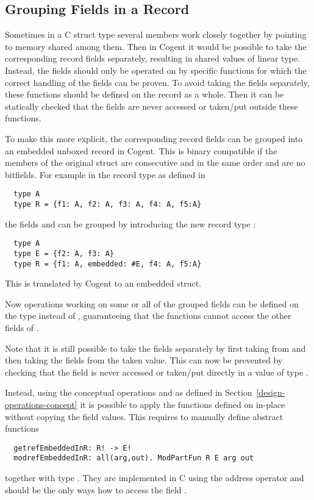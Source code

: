\subsection{Grouping Fields in a Record}
\label{app-transtype-group}

Sometimes in a C struct type several members work closely together by pointing to memory
shared among them. Then in Cogent it would be possible to take the corresponding record fields separately,
resulting in shared values of linear type. Instead, the fields should only be operated on by specific functions
for which the correct handling of the fields can be proven. To avoid taking the fields separately, these
functions should be defined on the record as a whole. Then it can be statically checked that the fields
are never accessed or taken/put outside these functions.

To make this more explicit, the corresponding record fields can be grouped into an embedded unboxed
record in Cogent. This is binary compatible if the members of the original struct are consecutive and in
the same order and are no bitfields. For example in the record type  as defined in 
\begin{verbatim}
  type A
  type R = {f1: A, f2: A, f3: A, f4: A, f5:A}
\end{verbatim}
the fields  and  can be grouped by introducing the new record type :
\begin{verbatim}
  type A
  type E = {f2: A, f3: A}
  type R = {f1: A, embedded: #E, f4: A, f5:A}
\end{verbatim}
This is translated by Cogent to an embedded struct.

Now operations working on some or all of the grouped fields can be defined on the type  instead
of , guaranteeing that the functions cannot access the other fields of .

Note that it is still possible to take the fields separately by first taking  from 
and then taking the fields from the taken value. This can now be prevented by checking that the field
 is never accessed or taken/put directly in a value of type .

Instead, using the conceptual operations  and  as defined in 
Section~\ref{design-operations-concept}
it is possible to apply the functions defined on  in-place without copying the field values.
This requires to manually define abstract functions
\begin{verbatim}
  getrefEmbeddedInR: R! -> E!
  modrefEmbeddedInR: all(arg,out). ModPartFun R E arg out
\end{verbatim}
together with type . They are implemented in C using the address operator \code{\&} and should
be the only ways how to access the field .

